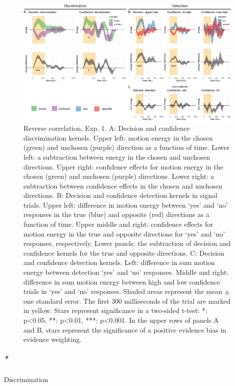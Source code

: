 \documentclass[
  english,
  man]{apa6}
\let\oldsubparagraph\subparagraph
\renewcommand{\subparagraph}[1]{\oldsubparagraph{#1}\mbox{}}
\begin{document}
\begin{figure}
\includegraphics[width=\textwidth]{figures/RC-exp1-RC} \caption[Discrimination and detection in a two-dimensional SDT model]{Reverse correlation, Exp. 1. A: Decision and confidence discrimination kernels. Upper left: motion energy in the chosen (green) and unchosen (purple) direction as a function of time. Lower left: a subtraction between energy in the chosen and unchosen directions. Upper right: confidence effects for motion energy in the chosen (green) and unchosen (purple) directions. Lower right: a subtraction between confidence effects in the chosen and unchosen directions. B: Decision and confidence detection kernels in signal trials. Upper left: difference in motion energy between `yes' and `no' responses in the true (blue) and opposite (red) directions as a function of time. Upper middle and right: confidence effects for motion energy in the true and opposite directions for `yes' and `no' responses, respectively. Lower panels: the subtraction of decision and confidence kernels for the true and opposite directions. C: Decision and confidence detection kernels. Left: difference in sum motion energy between detection `yes' and `no' responses. Middle and right: difference in sum motion energy between high and low confidence trials in `yes' and `no' responses. Shaded areas represent the mean \(\pm\) one standard error. The first 300 milliseconds of the trial are marked in yellow. Stars represent significance in a two-sided t-test: *: p\textless0.05, **: p\textless0.01, ***: p\textless0.001. In the upper rows of panels A and B, stars represent the significance of a positive evidence bias in evidence weighting.}\label{fig:RC-exp1-RC}
\end{figure}

\hypertarget{e1-disc-RC}{%
\subparagraph*{Discrimination}\label{e1-disc-RC}}
\end{document}
